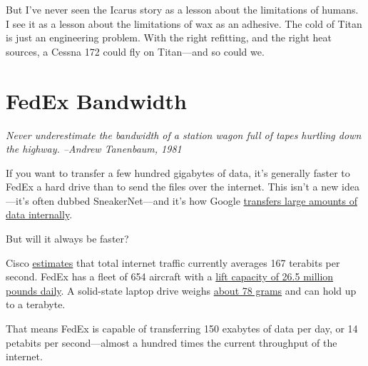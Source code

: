 {But I've never seen the Icarus story as a lesson about the limitations of humans. I see it as a lesson about the limitations of wax as an adhesive. The cold of Titan is just an engineering problem. With the right refitting, and the right heat sources, a Cessna 172 could fly on Titan—and so could we.}

{
\chapter{FedEx Bandwidth}
}

\hfill{}

{ \emph{Never underestimate the bandwidth of a station wagon full of tapes hurtling down the highway.
–Andrew Tanenbaum, 1981} }

{If you want to transfer a few hundred gigabytes of data, it’s generally faster to FedEx a hard drive than to send the files over the internet. This isn’t a new idea—it’s often dubbed SneakerNet—and it’s how Google \href{http://royal.pingdom.com/2007/04/11/fedex-still-faster-than-the-internet/}{transfers large amounts of data internally}.}

{But will it always be faster?}

{Cisco \href{http://www.cisco.com/en/US/solutions/collateral/ns341/ns525/ns537/ns705/ns827/white\_paper\_c11-481360\_ns827\_Networking\_Solutions\_White\_Paper.html}{estimates} that total internet traffic currently averages 167 terabits per second. FedEx has a fleet of 654 aircraft with a \href{http://www.fedex.com/sv\_english/about/facts.html}{lift capacity of 26.5 million pounds daily}. A solid-state laptop drive weighs \href{http://download.intel.com/newsroom/kits/ssd/pdfs/intel\_ssd\_520\_product\_spec\_325968.pdf}{about 78 grams} and can hold up to a terabyte.}

{That means FedEx is capable of transferring 150 exabytes of data per day, or 14 petabits per second—almost a hundred times the current throughput of the internet.}

